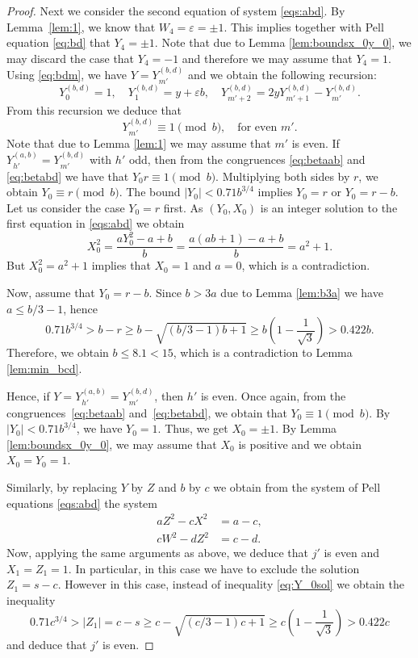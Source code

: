 \documentclass{amsart}
\theoremstyle{definition}
\begin{document}
\begin{proof}
Next we consider the second equation of system \eqref{eqs:abd}.
By Lemma~\ref{lem:1}, we know that $W_4=\varepsilon =\pm1$. This implies together with Pell equation \eqref{eq:bd} that $Y_4=\pm 1$.
Note that due to Lemma \ref{lem:boundsx_0y_0}, we may discard the case that $Y_4=-1$ and therefore we may assume that $Y_4=1$.
Using \eqref{eq:bdm}, we have $Y=Y^{(b,d)}_{m'}$ and we obtain the following recursion:
$$
Y^{(b,d)}_0 = 1, \quad Y^{(b,d)}_1 = y +\varepsilon b, \quad Y^{(b,d)}_{m'+2} = 2y Y^{(b,d)}_{m'+1} - Y^{(b,d)}_{m'}. 
$$
From this recursion we deduce that
\begin{equation}\label{eq:betabd}
Y^{(b,d)}_{m'}\equiv 1 \pmod{b},\quad \mbox{for even}\,\,m'. 
\end{equation}
Note that due to Lemma \ref{lem:1} we may assume that $m'$ is even.
If $Y^{(a,b)}_{h'}=Y^{(b,d)}_{m'}$ with $h'$ odd, then from the congruences \eqref{eq:betaab} and \eqref{eq:betabd} 
we have that $ Y_0 r\equiv 1 \pmod{b}$. 
Multiplying both sides by $r$, we obtain $Y_0 \equiv r \pmod{b} $. The bound $|Y_0|<0.71b^{3/4}$ implies $Y_0 = r$ or $Y_0=r-b$.
Let us consider the case $Y_0=r$ first.
As $(Y_0, X_0)$ is an integer solution to the first equation in \eqref{eqs:abd} we obtain
$$
X_0^2 =\frac{aY_0^2 -a+b}b = \frac{a(ab+1)-a+b}b = a^2+1. 
$$
But $X_0^2=a^2+1$ implies that $X_0=1$ and $a=0$, which is a contradiction.

Now, assume that $Y_0=r-b$. Since $b>3a$ due to Lemma \ref{lem:b3a} we have $a\leq b/3 -1$, hence
\begin{equation}\label{eq:Y_0sol}
0.71b^{3/4}>b-r\geq b-\sqrt{(b/3 -1)b+1}\geq b\left(1-\frac1{\sqrt 3}\right)>0.422 b.
\end{equation}
Therefore, we obtain $b\leq 8.1<15$, which is a contradiction to Lemma \ref{lem:min_bcd}.

Hence, if $Y=Y^{(a,b)}_{h'}=Y^{(b,d)}_{m'}$, then $h'$ is even. Once again, from the congruences~\eqref{eq:betaab} and~\eqref{eq:betabd},
we obtain that $ Y_0 \equiv 1 \pmod{b}$. By $|Y_0|<0.71b^{3/4}$, we have $Y_0=1$. Thus, we get $X_0=\pm 1$.
By Lemma \ref{lem:boundsx_0y_0}, we may assume that $X_0$ is positive and we obtain $X_0=Y_0=1$. 

Similarly, by replacing $Y$ by $Z$ and $b$ by $c$ we obtain from the system of Pell equations \eqref{eqs:abd} the system 
\begin{equation*}
 \begin{split}
aZ^2 - cX^2 &= a - c, \\
cW^2 - dZ^2 &= c - d.
\end{split}
\end{equation*}
Now, applying the same arguments as above, we deduce that $j'$ is even and $X_1=Z_1=1$. In particular, in this case we have to exclude the solution $Z_1=s-c$.
However in this case, instead of inequality \eqref{eq:Y_0sol} we obtain the inequality
$$0.71c^{3/4}>|Z_1|=c-s\geq c-\sqrt{(c/3 -1)c+1}\geq c\left(1-\frac1{\sqrt 3}\right)>0.422 c$$
and deduce that $j'$ is even.


\end{proof}
\end{document}
